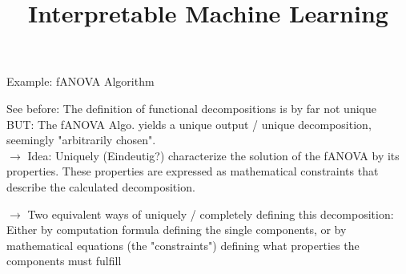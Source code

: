 \documentclass[11pt,compress,t,notes=noshow, aspectratio=169, xcolor=table]{beamer}
\title{Interpretable Machine Learning}
\date{}
\begin{document}
\newcommand{\titlefigure}{figure/open_blackbox}
\newcommand{\learninggoals}{
\item Understanding why fANOVA theoretically works and what constraints it satisfies
\item Understand the important role further constraints play for any functional decomposition?
\item ??}


\begin{frame}{Example: fANOVA Algorithm}

    See before: The definition of functional decompositions is by far not unique \\

    BUT: The fANOVA Algo. yields a unique output / unique decomposition, seemingly "arbitrarily chosen".\\

    \(\rightarrow\) Idea: Uniquely (Eindeutig?) characterize the solution of the fANOVA by its properties. These properties are expressed as mathematical constraints that describe the calculated decomposition.

    \(\rightarrow\) Two equivalent ways of uniquely / completely defining this decomposition: Either by computation formula defining the single components, or by mathematical equations (the "constraints") defining what properties the components must fulfill
    
\end{frame}
\end{document}
